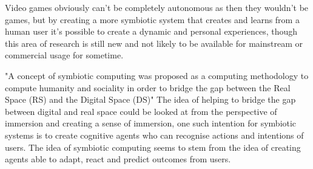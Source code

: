 \documentclass{scrartcl}
\begin{document}
Video games obviously can't be completely autonomous as then they wouldn't be games, but by creating a more symbiotic system \cite{kephart2015symbiotic} that creates and learns from a human user it's possible to create a dynamic and personal experiences, though this area of research is still new and not likely to be available for mainstream or commercial usage for sometime. 

"A concept of symbiotic computing was proposed as a computing methodology to compute humanity and sociality in order to bridge the gap between the Real Space (RS) and the Digital Space (DS)" \cite{sugawara2008design} The idea of helping to bridge the gap between digital and real space could be looked at from the perspective of immersion and creating a sense of immersion, one such intention for symbiotic systems is to create cognitive agents who can recognise actions and intentions of users. The idea of symbiotic computing seems to stem from the idea of creating agents able to adapt, react and predict outcomes from users. 



\end{document}
